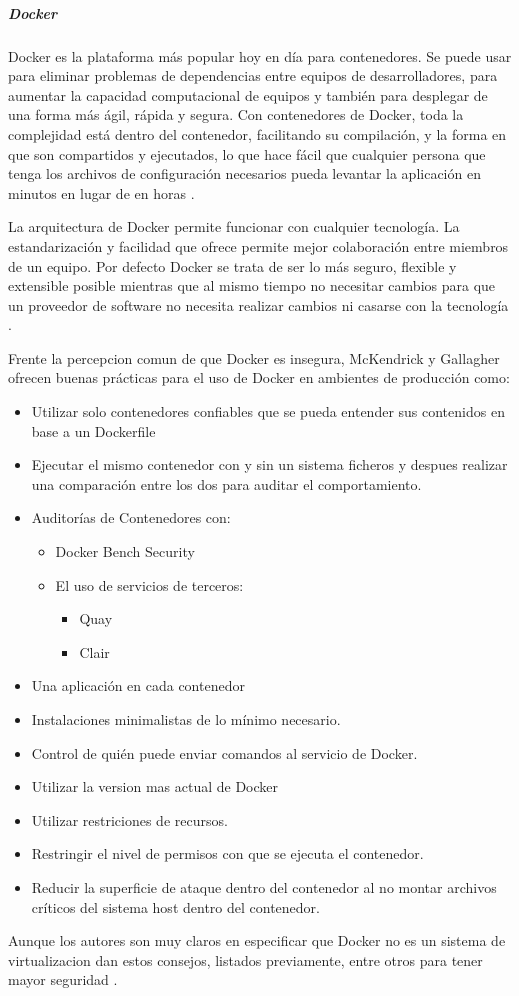 \subparagraph{Docker}
Docker es la plataforma más popular hoy en día para contenedores. Se puede usar para eliminar problemas de dependencias entre equipos de desarrolladores, para aumentar la capacidad computacional de equipos y también para desplegar de una forma más ágil, rápida y segura. Con contenedores de Docker, toda la complejidad está dentro del contenedor, facilitando su compilación, y la forma en que son compartidos y ejecutados, lo que hace fácil que cualquier persona que tenga los archivos de configuración necesarios pueda levantar la aplicación en minutos en lugar de en horas \citep{Docker-What-Is}.

La arquitectura de Docker permite funcionar con cualquier tecnología. La estandarización y facilidad que ofrece permite mejor colaboración entre miembros de un equipo. Por defecto Docker se trata de ser lo más seguro, flexible y extensible posible mientras que al mismo tiempo no necesitar cambios para que un proveedor de software no necesita realizar cambios ni casarse con la tecnología \citep{Docker}.

Frente la percepcion comun de que Docker es insegura, McKendrick y Gallagher ofrecen buenas prácticas para el uso de Docker en ambientes de producción como: 
\begin{itemize}
  \item Utilizar solo contenedores confiables que se pueda entender sus contenidos en base a un Dockerfile
  \item Ejecutar el mismo contenedor con y sin un sistema ficheros y despues realizar una comparación entre los dos para auditar el comportamiento.
  \item Auditorías de Contenedores con:
  \begin{itemize}
    \item Docker Bench Security
    \item El uso de servicios de terceros:
    \begin{itemize}
      \item Quay
      \item Clair
    \end{itemize}
  \end{itemize}
  \item Una aplicación en cada contenedor
  \item Instalaciones minimalistas de lo mínimo necesario.
  \item Control de quién puede enviar comandos al servicio de Docker.
  \item Utilizar la version mas actual de Docker
  \item Utilizar restriciones de recursos.
  \item Restringir el nivel de permisos con que se ejecuta el contenedor.
  \item Reducir la superficie de ataque dentro del contenedor al no montar archivos críticos del sistema host dentro del contenedor.
\end{itemize}
Aunque los autores son muy claros en especificar que Docker no es un sistema de virtualizacion dan estos consejos, listados previamente, entre otros para tener mayor seguridad \citep{McKendrickGallagher201707}.
  

